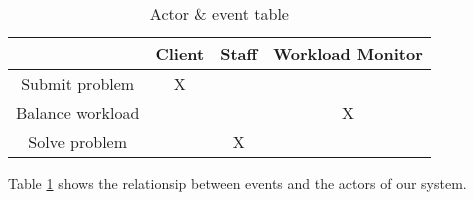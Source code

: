 \begin{table}[htdp]
\caption{Actor \& event table}
\begin{center}
\begin{tabular}{|c|c|c|c|}
\hline
 &   Client & Staff & Workload Monitor   \\ \hline%
Submit problem & X &  & \\ \hline%
Balance workload &   &  & X\\ \hline%
Solve problem &   & X & \\ \hline%


\end{tabular}
\end{center}
\label{tab:actoreventtable}
\end{table}%

Table \ref{tab:actoreventtable} shows the relationsip between events and the actors of our system.
